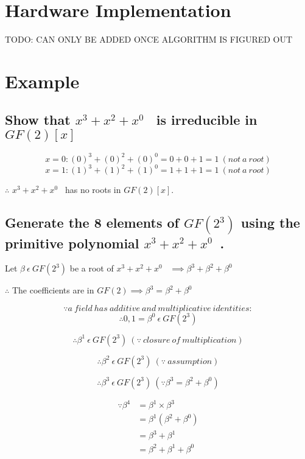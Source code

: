 \documentclass[paper=usletter, fontsize=12pt]{article}
\newcommand{\polynomial}{$x^{3}+x^{2}+x^{0}$}
\begin{document}
        \newpage

    \section{Hardware Implementation}
    TODO: CAN ONLY BE ADDED ONCE ALGORITHM IS FIGURED OUT

    \section{Example}
        \subsection{Show that \polynomial~ is irreducible in $GF(2)[x]$}

            \[ x=0: (0)^{3}+(0)^{2}+(0)^{0}=0+0+1=1 \ (not \ a \ root) \]
            \[ x=1: (1)^{3}+(1)^{2}+(1)^{0}=1+1+1=1 \ (not \ a \ root) \]
            \centerline{$\therefore$ \polynomial~ has no roots in $GF(2)[x]$.}

        \subsection{Generate the 8 elements of $GF(2^{3})$ using the primitive polynomial \polynomial~.}

            \centerline{Let $\beta \ \epsilon \ GF(2^{3})$ be a root of \polynomial~ $\implies \beta^{3}+\beta^{2}+\beta^{0}$}

            \hspace*{\fill}
            \centerline{$\therefore$ The coefficients are in $GF(2) \implies \beta^{3}=\beta^{2}+\beta^{0}$}

            \[ \because a \ field \ has \ additive \ and \ multiplicative \ identities: \]
            \[ \therefore 0, 1=\beta^{0} \ \epsilon \ GF(2^{3}) \]

            \[ \therefore \beta^{1} \ \epsilon \ GF(2^{3}) \ (\because \ closure \ of \ multiplication) \]

            \[ \therefore \beta^{2} \ \epsilon \ GF(2^{3}) \ (\because \ assumption) \]

            \[ \therefore \beta^{3} \ \epsilon \ GF(2^{3}) \ (\because \beta^{3}=\beta^{2}+\beta^{0}) \]

            \begin{equation*}
                \begin{split}
                    \because \beta^{4} & = \beta^{1} \times \beta^{3} \\
                    & = \beta^{1} (\beta^{2}+\beta^{0}) \\
                    & = \beta^{3}+\beta^{1} \\
                    & = \beta^{2}+\beta^{1}+\beta^{0}
                \end{split}
            \end{equation*}
\end{document}
